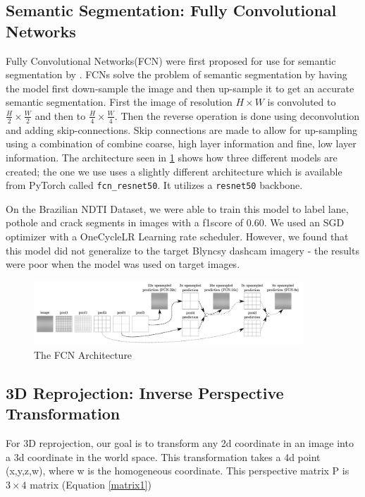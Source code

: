 \documentclass{article}
\begin{document}
\subsection{Semantic Segmentation: Fully Convolutional Networks} \label{FCN}
Fully Convolutional Networks(FCN) were first proposed for use for semantic segmentation by \cite{FCNforSemanticSegmentation}. FCNs solve the problem of semantic segmentation by having the model first down-sample the image and then up-sample it to get an accurate semantic segmentation. First the image of resolution $H \times W$ is convoluted to $\frac{H}{2} \times \frac{W}{2}$ and then to $\frac{H}{4} \times \frac{W}{4}$. Then the reverse operation is done using deconvolution and adding skip-connections. Skip connections are made to allow for up-sampling using a combination of combine coarse, high layer information and fine, low layer information. The architecture seen in \ref{fig:fcnmodel} shows how three different models are created; the one we use uses a slightly different architecture which is available from PyTorch called \verb|fcn_resnet50|. It utilizes a \verb|resnet50| backbone. 

On the Brazilian NDTI Dataset, we were able to train this model to label lane, pothole and crack segments in images with a f1score of $0.60$. We used an SGD optimizer with a OneCycleLR Learning rate scheduler.  However, we found that this model did not generalize to the target Blyncsy dashcam imagery - the results were poor when the model was used on target images.

\begin{figure}[ht]
\centering
\includegraphics[width=0.9\textwidth]{images/fcn-model.jpg}
\caption{The FCN Architecture}
\label{fig:fcnmodel}
\end{figure}    

\subsection{3D Reprojection: Inverse Perspective Transformation}
For 3D reprojection, our goal is to transform any 2d coordinate in an image into a 3d coordinate in the world space. This transformation takes a 4d point (x,y,z,w), where w is the homogeneous coordinate. This perspective matrix P is $3 \times 4$ matrix (Equation \ref{matrix1})\newline
\end{document}

